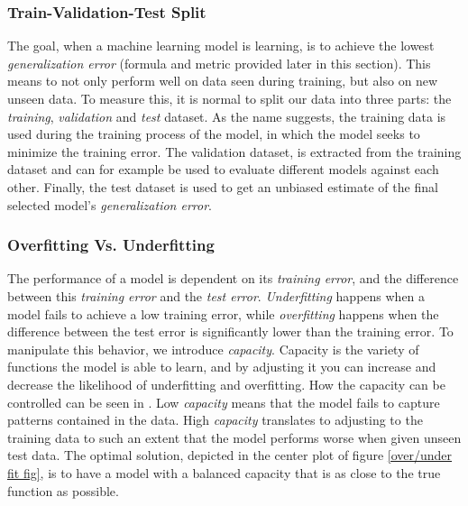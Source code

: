     \subsubsection{Train-Validation-Test Split}
        The goal, when a machine learning model is learning, is to achieve the lowest \textit{generalization error}\cite{Goodfellow-et-al-2016_generalization} (formula and metric provided later in this section). This means to not only perform well on data seen during training, but also on new unseen data. To measure this, it is normal to split our data into three parts\cite{Goodfellow-et-al-2016_train_val_test_split}: the \textit{training}, \textit{validation} and \textit{test} dataset. As the name suggests, the training data is used during the training process of the model, in which the model seeks to minimize the training error. The validation dataset, is extracted from the training dataset and can for example be used to evaluate different models against each other. Finally, the test dataset is used to get an unbiased estimate of the final selected model's \textit{generalization error}.
        
    
    \subsubsection{Overfitting Vs. Underfitting}
        The performance of a model is dependent on its \textit{training error}, and the difference between this \textit{training error} and the \textit{test error}. \textit{Underfitting} happens when a model fails to achieve a low training error, while \textit{overfitting} happens when the difference between the test error is significantly lower than the training error. To manipulate this behavior, we introduce \textit{capacity}. Capacity is the variety of functions the model is able to learn, and by adjusting it you can increase and decrease the likelihood of underfitting and overfitting. How the capacity can be controlled can be seen in \citeauthor{Goodfellow-et-al-2016}\cite{Goodfellow-et-al-2016}. Low \textit{capacity} means that the model fails to capture patterns contained in the data. High \textit{capacity} translates to adjusting to the training data to such an extent that the model performs worse when given unseen test data. The optimal solution, depicted in the center plot of figure \ref{over/under fit fig}, is to have a model with a balanced capacity that is as close to the true function as possible. 
        
        \citeauthor{Goodfellow-et-al-2016}\cite{Goodfellow-et-al-2016}
        
